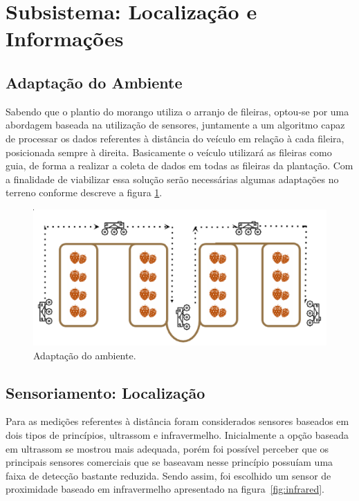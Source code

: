 \section{Subsistema: Localização e Informações}

  \subsection{Adaptação do Ambiente}

  Sabendo que o plantio do morango utiliza o arranjo de fileiras,
  optou-se por uma abordagem baseada na utilização de sensores, juntamente a um 
  algoritmo capaz de processar os dados referentes à distância do veículo em 
  relação à cada fileira, posicionada sempre à direita.
  Basicamente o veículo utilizará as fileiras como guia, de forma a realizar a 
  coleta de dados em todas as fileiras da plantação. Com a finalidade de viabilizar essa 
  solução serão necessárias algumas adaptações no terreno conforme descreve a figura \ref{fig:adapt}. 

  \begin{figure}[!htbp]
  \begin{center}
  \includegraphics[width=.7\textwidth]{figuras/adapt.eps}
  \caption{\label{fig:adapt}Adaptação do ambiente.}
  \end{center}
  \end{figure}

  \subsection{Sensoriamento: Localização}

  Para as medições referentes à distância foram considerados sensores baseados
  em dois tipos de princípios, ultrassom e infravermelho. Inicialmente a opção
  baseada em ultrassom se mostrou mais adequada, porém foi possível perceber
  que os principais sensores comerciais que se baseavam nesse princípio
  possuíam uma faixa de detecção bastante reduzida. Sendo assim, foi
  escolhido um sensor de proximidade baseado em infravermelho apresentado
  na figura~\ref{fig:infrared}.

